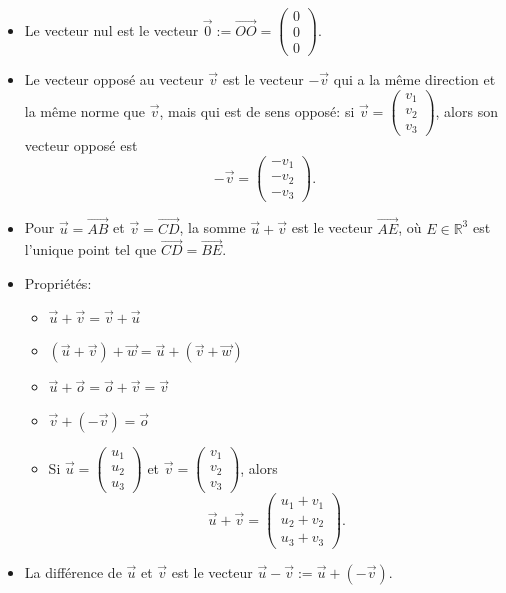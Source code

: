 \documentclass[12pt,a4paper]{article}
\newcommand{\vect}{\overrightarrow}
\begin{document}
\begin{itemize}[label=$\bullet$]
\item Le \colorbox{def!40}{vecteur nul} est le vecteur $\vect{0}:=\vect{OO}=\begin{pmatrix}
0\\0\\0
\end{pmatrix}$.
\item Le \colorbox{def!40}{vecteur opposé} au vecteur $\vect{v}$ est le vecteur $-\vect{v}$ qui a la même direction et la même norme que $\vect{v}$, mais qui est de sens opposé: si $\vect{v}=\begin{pmatrix}
v_1\\v_2\\v_3
\end{pmatrix}$, alors son vecteur opposé est $$-\vect{v}=\begin{pmatrix}
-v_1\\-v_2\\-v_3
\end{pmatrix}.$$
\item Pour $\vect{u}=\vect{AB}$ et $\vect{v}=\vect{CD}$, la \colorbox{def!40}{somme} $\vect{u}+\vect{v}$ est le vecteur $\vect{AE}$, où $E\in\mathbb{R}^3$ est l'unique point tel que $\vect{CD}=\vect{BE}$.
\item \textcolor{th!60!black}{Propriétés:}
\begin{itemize}[label=$\circ$]
\item $\vect{u}+\vect{v}=\vect{v}+\vect{u}$
\item $(\vect{u}+\vect{v})+\vect{w}=\vect{u}+(\vect{v}+\vect{w})$
\item $\vect{u}+\vect{o}=\vect{o}+\vect{v}=\vect{v}$
\item $\vect{v}+(-\vect{v})=\vect{o}$
\item Si $\vect{u}=\begin{pmatrix}
u_1\\u_2\\u_3
\end{pmatrix}$ et $\vect{v}=\begin{pmatrix}
v_1\\v_2\\v_3
\end{pmatrix}$, alors $$\vect{u}+\vect{v}=\begin{pmatrix}
u_1+v_1\\u_2+v_2\\u_3+v_3
\end{pmatrix}.$$
\end{itemize}
\item La \colorbox{def!40}{différence} de $\vect{u}$ et $\vect{v}$ est le vecteur $\vect{u}-\vect{v}:=\vect{u}+(-\vect{v})$.


\end{itemize}
\end{document}
